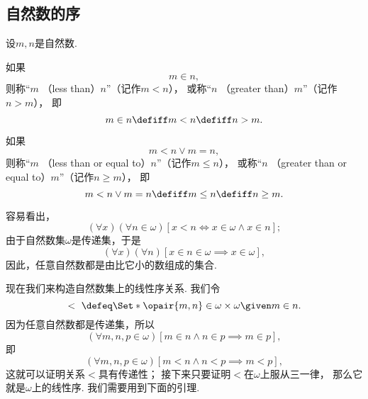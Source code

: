 \subsection{自然数的序}
\begin{definition}
设\(m,n\)是自然数.

如果\begin{equation*}
	m \in n,
\end{equation*}
则称“\(m\) （less than）\(n\)”（记作\(m < n\)），
或称“\(n\) （greater than）\(m\)”（记作\(n > m\)），
即\begin{equation*}
	m \in n
	\defiff m < n
	\defiff n > m.
\end{equation*}

如果\begin{equation*}
	m < n \lor m = n,
\end{equation*}
则称“\(m\) （less than or equal to）\(n\)”（记作\(m \leq n\)），
或称“\(n\) （greater than or equal to）\(m\)”（记作\(n \geq m\)），
即\begin{equation*}
	m < n \lor m = n
	\defiff m \leq n
	\defiff n \geq m.
\end{equation*}
\end{definition}

容易看出，\begin{equation*}
	(\forall x)(\forall n\in\omega)[
		x < n
		\iff
		x \in \omega \land x \in n
	];
\end{equation*}
由于自然数集\(\omega\)是传递集，于是\begin{equation*}
	(\forall x)(\forall n)[x \in n \in \omega \implies x \in \omega],
\end{equation*}
因此，任意自然数都是由比它小的数组成的集合.

现在我们来构造自然数集上的线性序关系.
我们令\begin{equation*}
	<\ \defeq \Set*{
		\opair{m,n} \in \omega \times \omega
		\given
		m \in n
	}.
\end{equation*}
因为任意自然数都是传递集，所以\begin{equation*}
	(\forall m,n,p \in \omega)[
		m \in n \land n \in p
		\implies
		m \in p
	],
\end{equation*}
即\begin{equation*}
	(\forall m,n,p \in \omega)[
		m < n \land n < p
		\implies
		m < p
	],
\end{equation*}
这就可以证明关系\(<\)具有传递性；
接下来只要证明\(<\)在\(\omega\)上服从三一律，
那么它就是\(\omega\)上的线性序.
我们需要用到下面的引理.

